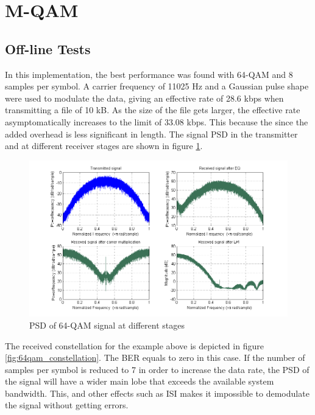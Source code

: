 \documentclass[12pt,a4paper,openright]{report}
\begin{document}
\section{M-QAM}

\subsection{Off-line Tests}
In this implementation, the best performance was found with 64-QAM and 8 samples per symbol. A carrier frequency of 11025 Hz and a Gaussian pulse shape were used to modulate the data, giving an effective rate of 28.6 kbps when transmitting a file of 10 kB. As the size of the file gets larger, the effective rate asymptomatically increases to the limit of 33.08 kbps. This because the since the added overhead is less significant in length. The signal PSD in the transmitter and at different receiver stages are shown in figure \ref{fig:QAMsignal}.  

 \begin{figure}[H]
 \centering
     \includegraphics[width=1\textwidth]{64QAMspectrum.png}
     \caption[PSD of 64-QAM signal at different stages]{PSD of 64-QAM signal at different stages}
    \label{fig:QAMsignal}
 \end{figure} 

 The received constellation for the example above is depicted in figure \ref{fig:64qam_constellation}. The BER equals to zero in this case. If the  number of samples per symbol is reduced  to 7 in order to increase the data rate, the PSD of the signal will have a wider main lobe that exceeds the available system bandwidth. This, and other effects such as ISI makes it impossible to demodulate the signal without getting errors.
 
\end{document}
